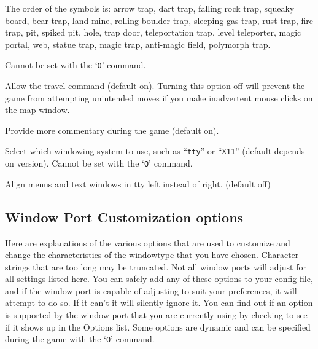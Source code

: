 The order of the symbols is:
arrow trap, dart trap, falling rock trap, squeaky board, bear trap,
land mine, rolling boulder trap, sleeping gas trap, rust trap, fire trap,
pit, spiked pit, hole, trap door, teleportation trap, level teleporter,
magic portal, web, statue trap, magic trap, anti-magic field, polymorph trap.

Cannot be set with the `{\tt O}' command.
\item[\ib{travel}]
Allow the travel command (default on).  Turning this option off will
prevent the game from attempting unintended moves if you make inadvertent
mouse clicks on the map window.
\item[\ib{verbose}]
Provide more commentary during the game (default on).
\item[\ib{windowtype}]
Select which windowing system to use, such as ``{\tt tty}'' or ``{\tt X11}''
(default depends on version).
Cannot be set with the `{\tt O}' command.
\item[\ib{win_edge}]
Align menus and text windows in tty left instead of right. (default off)
\elist

\subsection*{Window Port Customization options}

Here are explanations of the various options that are
used to customize and change the characteristics of the
windowtype that you have chosen.
Character strings that are too long may be truncated.
Not all window ports will adjust for all settings listed
here.  You can safely add any of these options to your 
config file, and if the window port is capable of adjusting 
to suit your preferences, it will attempt to do so. If it
can't it will silently ignore it.  You can find out if an 
option is supported by the window port that you are currently
using by checking to see if it shows up in the Options list.
Some options are dynamic and can be specified during the game
with the `{\tt O}' command.

